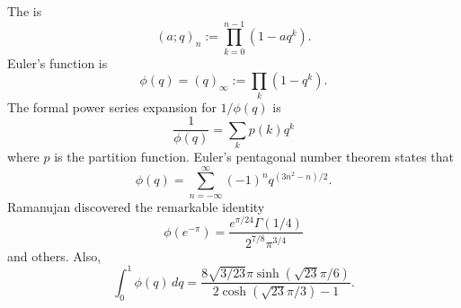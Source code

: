 \documentclass [preview, border = 20pt] {standalone}
\begin{document}
\pagecolor{black}
\color{white}
The  is
\[
 (a;q)_n := \prod_{k=0}^{n-1} (1-aq^k).
\]
Euler's function is 
\[
 \phi (q) = (q)_\infty := \prod_k (1-q^k).
\]
The formal power series expansion for $1/\phi(q)$ is 
\[
  \frac{1}{\phi(q)} = \sum_k p(k)q^k
\]
where $p$ is the partition function. Euler's pentagonal number theorem states that
\[
  \phi(q) = \sum_{n=-\infty}^\infty (-1)^n q^{(3n^2-n)/2}.
\]
Ramanujan discovered the remarkable identity
\[
 \phi(e^{-\pi}) = \frac{e^{\pi/24}\Gamma(1/4)}{2^{7/8}\pi^{3/4}}
\]
and others. Also,
\[
  \int_0^1 \phi(q)\, dq = \frac{8\sqrt{3/23} \pi\sinh(\sqrt{23}\pi/6)}{2\cosh(\sqrt{23}\pi/3)-1}.
\]
\end{document}
